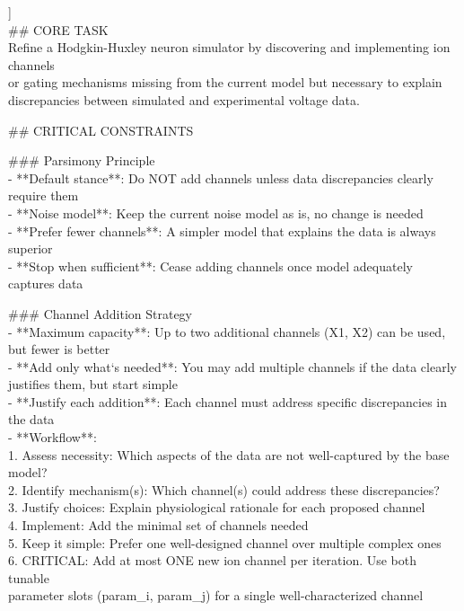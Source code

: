 \begin{tcolorbox}
\smallskip
\par\noindent [[ \#\# task\_description \#\# ]]\\
\noindent
\#\# CORE TASK\\{}
Refine a Hodgkin-Huxley neuron simulator by discovering and implementing ion channels\\{}
or gating mechanisms missing from the current model but necessary to explain\\{}
discrepancies between simulated and experimental voltage data.
\par\smallskip
\#\# CRITICAL CONSTRAINTS
\par\smallskip
\#\#\# Parsimony Principle\\{}
- **Default stance**: Do NOT add channels unless data discrepancies clearly require them\\{}
- **Noise model**: Keep the current noise model as is, no change is needed\\{}
- **Prefer fewer channels**: A simpler model that explains the data is always superior\\{}
- **Stop when sufficient**: Cease adding channels once model adequately captures data
\par\smallskip
\#\#\# Channel Addition Strategy\\{}
- **Maximum capacity**: Up to two additional channels (X1, X2) can be used, but fewer is better\\{}
- **Add only what`s needed**: You may add multiple channels if the data clearly justifies them, but start simple\\{}
- **Justify each addition**: Each channel must address specific discrepancies in the data\\{}
- **Workflow**:\\{}
  1. Assess necessity: Which aspects of the data are not well-captured by the base model?\\{}
  2. Identify mechanism(s): Which channel(s) could address these discrepancies?\\{}
  3. Justify choices: Explain physiological rationale for each proposed channel\\{}
  4. Implement: Add the minimal set of channels needed\\{}
  5. Keep it simple: Prefer one well-designed channel over multiple complex ones\\{}
  6. CRITICAL: Add at most ONE new ion channel per iteration. Use both tunable\\{}
     parameter slots (param\_i, param\_j) for a single well-characterized channel\\{}

\end{tcolorbox}
